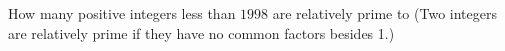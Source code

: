 How many positive integers less than $1998$ are relatively prime to  (Two integers are relatively prime if they have no common factors besides 1.)